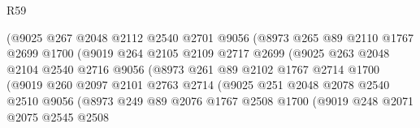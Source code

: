 \begin{lexlean}{R59}
\begin{coremodule}
                            (@9025
                              @267
                              @2048
                              @2112
                              @2540
                              @2701
                              @9056
                              (@8973
                                @265
                                @89
                                @2110
                                @1767
                                @2699
                                @1700
                                (@9019
                                  @264
                                  @2105
                                  @2109
                                  @2717
                                  @2699
                                  (@9025
                                    @263
                                    @2048
                                    @2104
                                    @2540
                                    @2716
                                    @9056
                                    (@8973
                                      @261
                                      @89
                                      @2102
                                      @1767
                                      @2714
                                      @1700
                                      (@9019
                                        @260
                                        @2097
                                        @2101
                                        @2763
                                        @2714
                                        (@9025
                                          @251
                                          @2048
                                          @2078
                                          @2540
                                          @2510
                                          @9056
                                          (@8973
                                            @249
                                            @89
                                            @2076
                                            @1767
                                            @2508
                                            @1700
                                            (@9019
                                              @248
                                              @2071
                                              @2075
                                              @2545
                                              @2508

\end{coremodule}
\end{lexlean}
